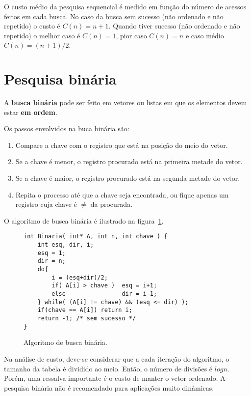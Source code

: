 O custo médio da pesquisa sequencial é medido em função do número de acessos
feitos em cada busca.
No caso da busca sem sucesso (não ordenado e não repetido) o custo é $C(n) =
n+1$.
Quando tiver sucesso (não ordenado e não repetido)  o melhor caso é $C(n) = 1$,
pior caso $C(n)=n$ e caso médio $C(n) = (n+1)/2$.

\section{Pesquisa binária}

A {\bf busca binária} pode ser feito em vetores ou listas em que os elementos
devem estar {\bf em ordem}.

Os passos envolvidos na buca binária são:
\begin{enumerate}
\item Compare a chave com o registro que está na posição do meio do vetor.

\item Se a chave é menor, o registro procurado está na primeira metade do vetor.

\item Se a chave é maior, o registro procurado está na segunda metade do vetor.

\item Repita o processo até que a chave seja encontrada, ou fique apenas um
registro cuja chave é $\neq$ da procurada.
\end{enumerate}
O algoritmo de busca binária é ilustrado na figura~\ref{aula05:algo:binaria}.
\begin{figure}[!htb]
\centering
\begin{framed}
\begin{lstlisting}
int Binaria( int* A, int n, int chave ) {
	int esq, dir, i;
	esq = 1;
	dir = n;
	do{
		i = (esq+dir)/2;
		if( A[i] > chave )  esq = i+1;
		else                dir = i-1;
	} while( (A[i] != chave) && (esq <= dir) );
	if(chave == A[i]) return i;
	return -1; /* sem sucesso */
}
\end{lstlisting}
\end{framed}
\caption{Algoritmo de busca binária.}
\label{aula05:algo:binaria}
\end{figure}

Na análise de custo, deve-se considerar que a cada iteração do algoritmo,
o tamanho da tabela é dividido ao meio.
Então, o número de divisões é $log n $.
Porém, uma ressalva importante é o custo de manter o vetor ordenado.
A pesquisa binária não é recomendado para aplicações muito dinâmicas.

